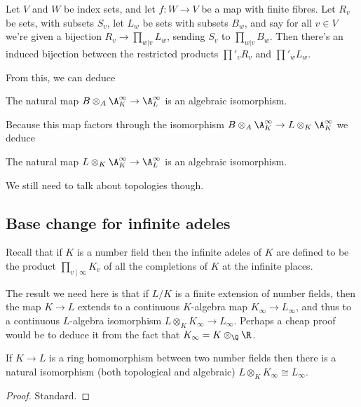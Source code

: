 \begin{definition}
  \label{TODOtemplabel11}
  Let $V$ and $W$ be index sets, and let $f:W\to V$ be a map with finite fibres.
  Let $R_v$ be sets, with subsets $S_v$, let $L_w$ be sets with subsets $B_w$,
  and say for all $v\in V$ we're given a bijection $R_v\to\prod_{w|v}L_w$,
  sending $S_v$ to $\prod_{w|v}B_w$. Then there's an induced bijection between
  the restricted products $\prod'_v R_v$ and $\prod'_w L_w$.
\end{definition}

From this, we can deduce

\begin{theorem}
  \label{TODOtemplabel10}
  The natural map $B\otimes_A\A_K^\infty\to\A_L^\infty$ is an algebraic
  isomorphism.
\end{theorem}
Because this map factors through the isomorphism $B\otimes_A\A_K^\infty\to L\otimes_K\A_K^\infty$
we deduce
\begin{corollary} The natural map $L\otimes_K\A_K^\infty\to\A_L^\infty$ is an algebraic
  isomorphism.
\end{corollary}

We still need to talk about topologies though.

\subsection{Base change for infinite adeles}

Recall that if $K$ is a number field then the infinite adeles of $K$ are defined
to be the product $\prod_{v\mid\infty} K_v$ of all the completions of $K$ at the
infinite places.

The result we need here is that if $L/K$ is a finite extension of number fields,
then the map $K\to L$ extends to a continuous $K$-algebra map $K_\infty\to L_\infty$,
and thus to a continuous $L$-algebra isomorphism $L\otimes_KK_\infty\to L_\infty$.
Perhaps a cheap proof would be to deduce it from the fact that $K_\infty=K\otimes_{\Q}\R$.

\begin{theorem}
  \label{NumberField.InfiniteAdeleRing.baseChangeEquiv}
  If $K\to L$ is a ring homomorphism between two number fields then there is a natural isomorphism
  (both topological and algebraic) $L\otimes_KK_\infty\cong L_\infty$.
\end{theorem}
\begin{proof}
  Standard.
\end{proof}


